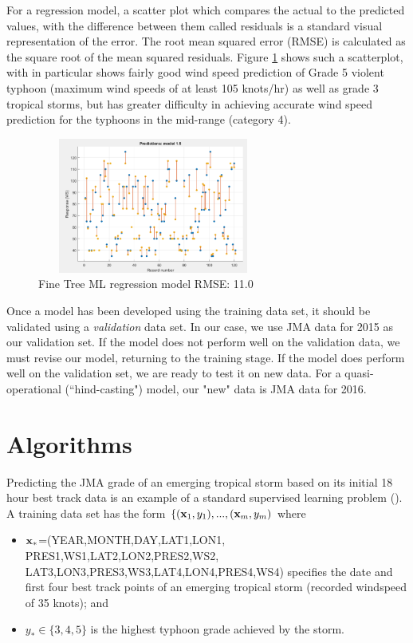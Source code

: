 \documentclass{SBCbookchapter}
\begin{document}
  
For a regression model, a scatter plot which compares the actual to the predicted values, with the difference between them called residuals is a standard visual representation of the error. The root mean squared error (RMSE) is calculated as the square root of the mean squared residuals. Figure \ref{FineTreeRegression} shows such a scatterplot, with in particular shows fairly good wind speed prediction of Grade 5 violent typhoon (maximum wind speeds of at least 105 knots/hr) as well as grade 3 tropical storms, but has greater difficulty in achieving accurate wind speed prediction for the typhoons in the mid-range (category 4).

\begin{figure}[!htpb]
	\centering
	\includegraphics[width=3in,height=1.75in]{TyphoonCM2.png}
	\caption{Fine Tree ML regression model RMSE: 11.0 }
	\label{FineTreeRegression}
\end{figure}



Once a model has been developed using the training data set, it should be validated using a \emph{validation} data set. In our case, we use JMA data for 2015  as our validation set.  If the model does not perform well on the validation data, we must revise our model, returning to the training stage.  If the model does perform well on the validation set, we are ready to test it on new data. For a quasi-operational (``hind-casting") model, our "new" data is JMA data for 2016.

\section{Algorithms}

Predicting the JMA grade of an emerging tropical storm based on its initial 18 hour best track data is an example of a standard supervised learning problem (\cite{Diet}). A training data set has the form $\{({\bf x}_1,y_1),...,({\bf x}_m,y_m)$  where 
\begin{itemize}
\item ${\bf x_*}$=(YEAR,MONTH,DAY,LAT1,LON1,
PRES1,WS1,LAT2,LON2,PRES2,WS2,\\LAT3,LON3,PRES3,WS3,LAT4,LON4,PRES4,WS4) specifies the date and first four best track points of an emerging tropical storm (recorded windspeed of 35 knots); and 
\item $y_*\in\{3,4,5\}$ is the highest typhoon grade achieved by the storm. 
\end{itemize}
\end{document}
